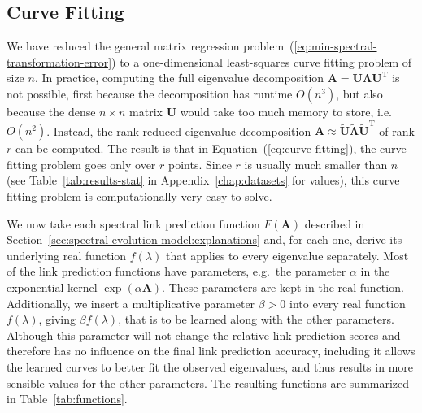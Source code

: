 \documentclass[11pt,a4paper]{book}
\newcommand{\syRank}{r}
\begin{document}
\subsection{Curve Fitting}
\label{sec:curve-fitting}
We have reduced the general matrix regression
problem~(\ref{eq:min-spectral-transformation-error}) to a 
one-dimensional least-squares curve fitting problem of size $n$.  In
practice, computing the full eigenvalue decomposition $\mathbf A
= \mathbf U \mathbf \Lambda \mathbf U^{\mathrm T}$ is not possible,
first because the decomposition has runtime $O(n^3)$, but also 
because the dense $n
\times n$ matrix $\mathbf U$ would take too much memory to store, 
i.e.\ $O(n^2)$.  
Instead, the
rank-reduced eigenvalue decomposition $\mathbf A \approx \mathbf {\tilde U}
\mathbf {\tilde \Lambda} \mathbf {\tilde U}^{\mathrm T}$ of rank $\syRank$ can be computed.  The
result is that in Equation~(\ref{eq:curve-fitting}), the curve fitting
problem goes only over $\syRank$ points.  Since $\syRank$ is usually much smaller
than $n$ (see Table~\ref{tab:results-stat} in
Appendix~\ref{chap:datasets} for values), this curve 
fitting problem is computationally very easy to solve.  

We now take each spectral link prediction function $F(\mathbf A)$ described in
Section~\ref{sec:spectral-evolution-model:explanations} and, for each
one, derive its underlying real 
function $f(\lambda)$ that applies to every eigenvalue separately.  Most
of the link prediction functions have parameters, e.g.\ the parameter
$\alpha$ in the exponential kernel $\exp(\alpha \mathbf A)$.  These
parameters are kept in the real function.  
Additionally, we insert a multiplicative parameter $\beta > 0$ into
every real function $f(\lambda)$, giving $\beta f(\lambda)$, 
that is to be learned along with the other parameters. 
Although this parameter will not change the relative link prediction
scores and therefore has no influence on the final link prediction
accuracy, including it allows the learned curves to better fit the
observed eigenvalues, and thus results in more sensible values for the
other parameters. 
The resulting functions are summarized in Table~\ref{tab:functions}.  
\end{document}
